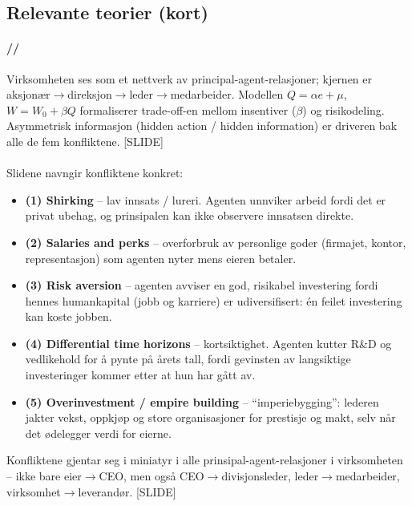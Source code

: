 \subsection*{Relevante teorier (kort)}

\paragraph{\quad\SOne/\STwo/\SThree}
Virksomheten ses som et nettverk av principal-agent-relasjoner; kjernen er aksjonær$\to$direksjon$\to$leder$\to$medarbeider. Modellen $Q=\alpha e+\mu$, $W=W_0+\beta Q$ formaliserer trade-off-en mellom insentiver ($\beta$) og risikodeling. Asymmetrisk informasjon (hidden action / hidden information) er driveren bak alle de fem konfliktene. [SLIDE]

\paragraph{\quad\SThree}
Slidene navngir konfliktene konkret:
\begin{itemize}\setlength{\itemsep}{1pt}
\item \textbf{(1) Shirking} -- lav innsats / lureri. Agenten unnviker arbeid fordi det er privat ubehag, og prinsipalen kan ikke observere innsatsen direkte.
\item \textbf{(2) Salaries and perks} -- overforbruk av personlige goder (firmajet, kontor, representasjon) som agenten nyter mens eieren betaler.
\item \textbf{(3) Risk aversion} -- agenten avviser en god, risikabel investering fordi hennes humankapital (jobb og karriere) er udiversifisert: én feilet investering kan koste jobben.
\item \textbf{(4) Differential time horizons} -- kortsiktighet. Agenten kutter R\&D og vedlikehold for å pynte på årets tall, fordi gevinsten av langsiktige investeringer kommer etter at hun har gått av.
\item \textbf{(5) Overinvestment / empire building} -- ``imperiebygging'': lederen jakter vekst, oppkjøp og store organisasjoner for prestisje og makt, selv når det ødelegger verdi for eierne.
\end{itemize}
Konfliktene gjentar seg i miniatyr i alle prinsipal-agent-relasjoner i virksomheten -- ikke bare eier$\to$CEO, men også CEO$\to$divisjonsleder, leder$\to$medarbeider, virksomhet$\to$leverandør. [SLIDE]

